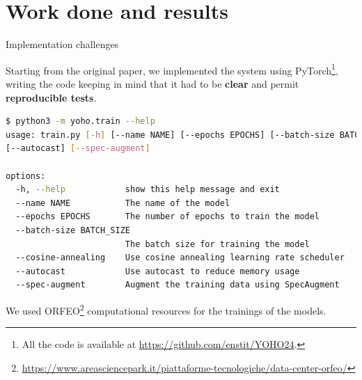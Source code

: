 \section[Work done and results]{Work done and results}	

	\begin{frame}[fragile]{Implementation challenges}
	
		Starting from the original paper, we implemented the system using PyTorch\footnote{All the code is available at \url{https://github.com/enstit/YOHO24}.},
		writing the code keeping in mind that it had to be \textbf{clear} and permit \textbf{reproducible tests}.
		
		\begin{lstlisting}[basicstyle=\tiny\ttfamily\color{white},language=bash,backgroundcolor=\color{black},caption={Training script parameters}, label={trainingParams},captionpos=b]
$ python3 -m yoho.train --help
usage: train.py [-h] [--name NAME] [--epochs EPOCHS] [--batch-size BATCH_SIZE] [--cosine-annealing]
[--autocast] [--spec-augment]

options:
  -h, --help            show this help message and exit
  --name NAME           The name of the model
  --epochs EPOCHS       The number of epochs to train the model
  --batch-size BATCH_SIZE
                        The batch size for training the model
  --cosine-annealing    Use cosine annealing learning rate scheduler
  --autocast            Use autocast to reduce memory usage
  --spec-augment        Augment the training data using SpecAugment
		\end{lstlisting}

		We used ORFEO\footnote{\url{https://www.areasciencepark.it/piattaforme-tecnologiche/data-center-orfeo/}} computational resources for the trainings of the models.
		
	\end{frame}
	
